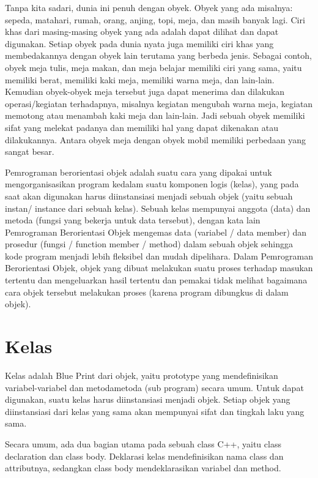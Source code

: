 Tanpa kita sadari, dunia ini penuh dengan obyek. Obyek yang ada
misalnya: sepeda, matahari, rumah, orang, anjing, topi, meja, dan masih
banyak lagi. Ciri khas dari masing-masing obyek yang ada adalah dapat
dilihat dan dapat digunakan. Setiap obyek pada dunia nyata juga memiliki
ciri khas yang membedakannya dengan obyek lain terutama yang berbeda
jenis. Sebagai contoh, obyek meja tulis, meja makan, dan meja belajar
memiliki ciri yang sama, yaitu memiliki berat, memiliki kaki meja,
memiliki warna meja, dan lain-lain. Kemudian obyek-obyek meja tersebut
juga dapat menerima dan dilakukan operasi/kegiatan terhadapnya, misalnya
kegiatan mengubah warna meja, kegiatan memotong atau menambah kaki meja
dan lain-lain. Jadi sebuah obyek memiliki sifat yang melekat padanya dan
memiliki hal yang dapat dikenakan atau dilakukannya. Antara obyek meja
dengan obyek mobil memiliki perbedaan yang sangat besar.

Pemrograman berorientasi objek adalah suatu cara yang dipakai untuk
mengorganisasikan program kedalam suatu komponen logis (kelas), yang
pada saat akan digunakan harus diinstansiasi menjadi sebuah objek (yaitu
sebuah instan/ instance dari sebuah kelas). Sebuah kelas mempunyai
anggota (data) dan metoda (fungsi yang bekerja untuk data tersebut),
dengan kata lain Pemrograman Berorientasi Objek mengemas data (variabel
/ data member) dan prosedur (fungsi / function member / method) dalam
sebuah objek sehingga kode program menjadi lebih fleksibel dan mudah
dipelihara. Dalam Pemrograman Berorientasi Objek, objek yang dibuat
melakukan suatu proses terhadap masukan tertentu dan mengeluarkan hasil
tertentu dan pemakai tidak melihat bagaimana cara objek tersebut
melakukan proses (karena program dibungkus di dalam objek).

\section{Kelas}\label{kelas}

Kelas adalah Blue Print dari objek, yaitu prototype yang mendefinisikan
variabel-variabel dan metodametoda (sub program) secara umum. Untuk
dapat digunakan, suatu kelas harus diinstansiasi menjadi objek. Setiap
objek yang diinstansiasi dari kelas yang sama akan mempunyai sifat dan
tingkah laku yang sama.

Secara umum, ada dua bagian utama pada sebuah class C++, yaitu class
declaration dan class body. Deklarasi kelas mendefinisikan nama class
dan attributnya, sedangkan class body mendeklarasikan variabel dan
method.

